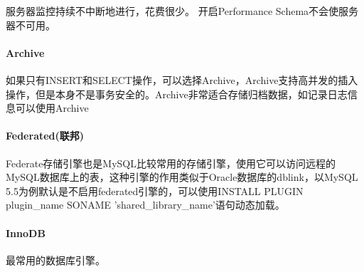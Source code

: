 \documentclass[../../../interview-questions.tex]{subfiles}
\begin{document}
服务器监控持续不中断地进行，花费很少。 开启Performance Schema不会使服务器不可用。

\paragraph{Archive}

如果只有INSERT和SELECT操作，可以选择Archive，Archive支持高并发的插入操作，但是本身不是事务安全的。Archive非常适合存储归档数据，如记录日志信息可以使用Archive

\paragraph{Federated(联邦)}

Federate存储引擎也是MySQL比较常用的存储引擎，使用它可以访问远程的MySQL数据库上的表，这种引擎的作用类似于Oracle数据库的dblink，以MySQL 5.5为例默认是不启用federated引擎的，可以使用INSTALL PLUGIN plugin\_name SONAME 'shared\_library\_name'语句动态加载。

\paragraph{InnoDB}

最常用的数据库引擎。
\end{document}
